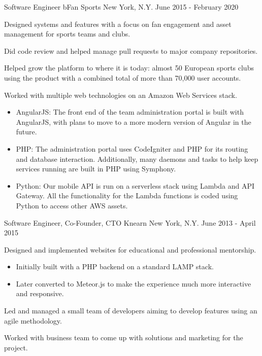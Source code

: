 \begin{cventries}
  \cventry
    {Software Engineer} %
    {bFan Sports} %
    {New York, N.Y.} %
    {June 2015 - February 2020} %
    {
      \begin{cvitems} %
        \item {Designed systems and features with a focus on fan engagement and asset management for sports teams and clubs.}
        \item {Did code review and helped manage pull requests to major company repositories.}
        \item {Helped grow the platform to where it is today: almost 50 European sports clubs using the product with a combined total of more than 70,000 user accounts.}
        \item {Worked with multiple web technologies on an Amazon Web Services stack.}
        \begin{itemize}
          \item {AngularJS: The front end of the team administration portal is built with AngularJS, with plans to move to a more modern version of Angular in the future.}
          \item {PHP: The administration portal uses CodeIgniter and PHP for its routing and database interaction. Additionally, many daemons and tasks to help keep services running are built in PHP using Symphony.}
          \item {Python: Our mobile API is run on a serverless stack using Lambda and API Gateway. All the functionality for the Lambda functions is coded using Python to access other AWS assets.}
        \end{itemize}
      \end{cvitems}
    }

  \cventry
    {Software Engineer, Co-Founder, CTO} %
    {Knearn} %
    {New York, N.Y.} %
    {June 2013 - April 2015} %
    {
      \begin{cvitems} %
        \item {Designed and implemented websites for educational and professional mentorship.}
        \begin{itemize}
          \item {Initially built with a PHP backend on a standard LAMP stack.}
          \item {Later converted to Meteor.js to make the experience much more interactive and responsive.}
        \end{itemize}
        \item {Led and managed a small team of developers aiming to develop features using an agile methodology.}
        \item {Worked with business team to come up with solutions and marketing for the project.}
      \end{cvitems}
    }


\end{cventries}
